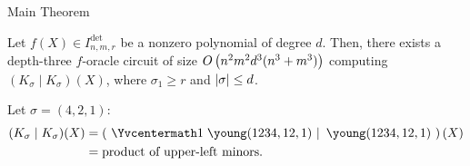 \documentclass[aspectratio=169]{beamer}
\begin{document}

\begin{frame}{Main Theorem}
  \begin{thrm}
    Let $f(X) \in I^{\det}_{n, m, r}$ be a nonzero polynomial of degree $d$.
    Then, there exists a depth-three $f$-oracle circuit of size $O\kern-0.0pt\left(n^2m^2d^3(n^3+m^3)\right)$ computing $(K_\sigma \mid K_\sigma)(X)$, where $\sigma_1 \geq r$ and $\abs{\sigma} \leq d$.
  \end{thrm}

  \pause

  \begin{defn}
    Let $\sigma = (4, 2, 1)$:
    \begin{align*}
      (K_\sigma \mid K_\sigma)(X) &= \left(\ \Yvcentermath1 \left. \young(1234,12,1)\ \right\vert\ \young(1234,12,1) \ \right)(X) \\
                                  &= \text{product of upper-left minors}.
    \end{align*}
  \end{defn}
\end{frame}
\end{document}
